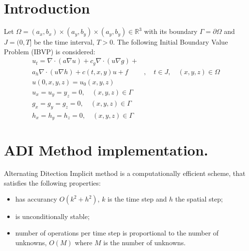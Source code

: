 \documentclass[12pt]{article}
\begin{document}
\section{Introduction}
Let $\Omega=(a_x, b_x)\times(a_y, b_y) \times (a_y, b_y) \in
\mathbb{R}^3$ with its boundary $\Gamma=\partial \Omega$ and
$J=(0,T]$ be the time interval, $T>0$. The following Initial Boundary
Value Problem (IBVP) is considered:
\begin{eqnarray}
u_t= \nabla\cdot(a\nabla u) + c_g\nabla\cdot(u \nabla g) +  \nonumber \\
a_h\nabla\cdot(u \nabla h) +c(t, x, y) u + f&, \quad t\in J, \quad 
(x,y,z)\in \Omega \label{eq:heat}\\
u(0,x,y,z) = u_0(x,y,z)\\
u_x=u_y=y_z = 0, \quad (x,y,z) \in \Gamma \\ 
g_x=g_y=g_z = 0, \quad (x,y,z) \in\Gamma \\
h_x=h_y=h_z = 0, \quad (x,y,z) \in\Gamma 
\end{eqnarray}




\section{ADI Method implementation.}
Alternating Ditection Implicit method is a computationally efficient
scheme, that satisfies the
  following properties:
  \begin{itemize}
\item has accurancy $O(k^2 + h^2)$, $k$ is the time step and $h$ the
spatial step;
    \item is unconditionally stable;
\item number of operations per time step is proportional to the number
of unknowns, $O(M)$
     where $M$ is the number of unknowns.       
  \end{itemize}
\end{document}
